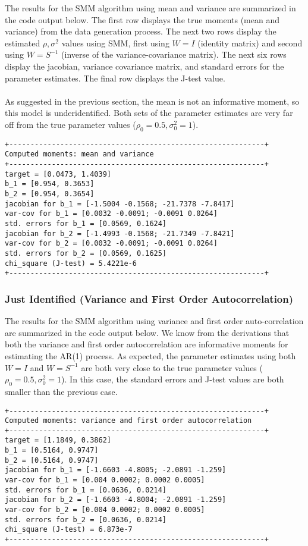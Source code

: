 \documentclass[12pt]{article}
\begin{document}
The results for the SMM algorithm using mean and variance are summarized in the code output below. The first row displays the true moments (mean and variance) from the data generation process. The next two rows display the estimated $\rho, \sigma^2$ values using SMM, first using $W = I$ (identity matrix) and second using $W=S^{-1}$ (inverse of the variance-covariance matrix). The next six rows display the jacobian, variance covariance matrix, and standard errors for the parameter estimates. The final row displays the J-test value.\\\\
As suggested in the previous section, the mean is not an informative moment, so this model is underidentified. Both sets of the parameter estimates are very far off from the true parameter values ($\rho_0 = 0.5, \sigma_0^2 = 1$).
\begin{verbatim}
+------------------------------------------------------------+
Computed moments: mean and variance
+------------------------------------------------------------+
target = [0.0473, 1.4039]
b_1 = [0.954, 0.3653]
b_2 = [0.954, 0.3654]
jacobian for b_1 = [-1.5004 -0.1568; -21.7378 -7.8417]
var-cov for b_1 = [0.0032 -0.0091; -0.0091 0.0264]
std. errors for b_1 = [0.0569, 0.1624]
jacobian for b_2 = [-1.4993 -0.1568; -21.7349 -7.8421]
var-cov for b_2 = [0.0032 -0.0091; -0.0091 0.0264]
std. errors for b_2 = [0.0569, 0.1625]
chi_square (J-test) = 5.4221e-6
+------------------------------------------------------------+
\end{verbatim}

\clearpage
\subsubsection*{Just Identified (Variance and First Order Autocorrelation)}

The results for the SMM algorithm using variance and first order auto-correlation are summarized in the code output below. We know from the derivations that both the variance and first order autocorrelation are informative moments for estimating the AR(1) process. As expected, the parameter estimates using both $W= I$ and $W = S^{-1}$ are both very close to the true parameter values ($\rho_0 = 0.5, \sigma_0^2 = 1$). In this case, the standard errors and J-test values are both smaller than the previous case.

\begin{verbatim}
+------------------------------------------------------------+
Computed moments: variance and first order autocorrelation
+------------------------------------------------------------+
target = [1.1849, 0.3862]
b_1 = [0.5164, 0.9747]
b_2 = [0.5164, 0.9747]
jacobian for b_1 = [-1.6603 -4.8005; -2.0891 -1.259]
var-cov for b_1 = [0.004 0.0002; 0.0002 0.0005]
std. errors for b_1 = [0.0636, 0.0214]
jacobian for b_2 = [-1.6603 -4.8004; -2.0891 -1.259]
var-cov for b_2 = [0.004 0.0002; 0.0002 0.0005]
std. errors for b_2 = [0.0636, 0.0214]
chi_square (J-test) = 6.873e-7
+------------------------------------------------------------+
\end{verbatim}
\end{document}
